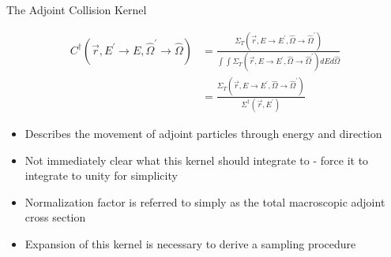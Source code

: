 \documentclass{beamer}
\begin{document}
\begin{frame}{The Adjoint Collision Kernel}

  \begin{align}
    C^{\dagger}(\vec{r},E^{'} \to E,\hat{\Omega}^{'} \to \hat{\Omega}) & = 
    \frac{\Sigma_T(\vec{r},E \to E^{'},\hat{\Omega} \to \hat{\Omega}^{'})}
         {\int\int \Sigma_T(\vec{r},E \to E^{'},\hat{\Omega} \to \hat{\Omega}^{'})
           dE d\hat{\Omega}} \nonumber \\
         & = \frac{\Sigma_T(\vec{r},E \to E^{'},\hat{\Omega} \to \hat{\Omega}^{'})}
         {\Sigma^{\dagger}(\vec{r},E^{'})} \nonumber
  \end{align}

  \begin{itemize}
    \item Describes the movement of adjoint particles through energy and 
      direction
      \medskip
    \item Not immediately clear what this kernel should integrate to - force it
      to integrate to unity for simplicity
      \medskip
    \item Normalization factor is referred to simply as the total macroscopic 
      adjoint cross section
      \medskip
    \item Expansion of this kernel is necessary to derive a sampling procedure
  \end{itemize}

\end{frame}
\end{document}
